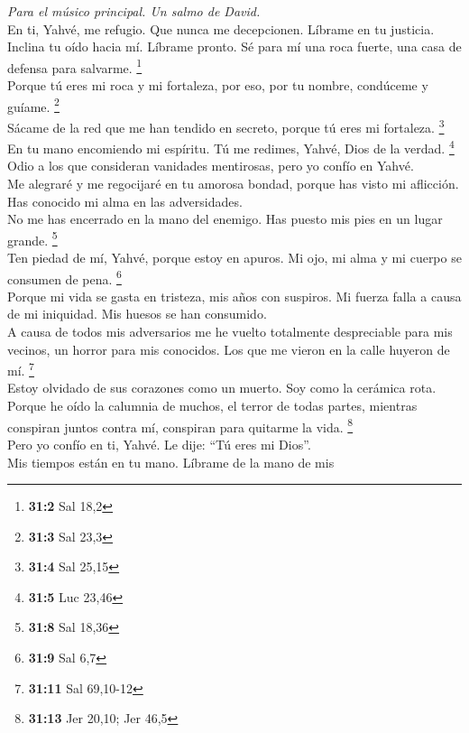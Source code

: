 \emph{Para el músico principal. Un salmo de David.}\\
 En ti, Yahvé, me refugio. Que nunca me decepcionen.
Líbrame en tu justicia.\\
 Inclina tu oído hacia mí. Líbrame pronto. Sé para mí una
roca fuerte, una casa de defensa para salvarme. \footnote{\textbf{31:2}
  Sal 18,2}\\
 Porque tú eres mi roca y mi fortaleza, por eso, por tu
nombre, condúceme y guíame. \footnote{\textbf{31:3} Sal 23,3}\\
 Sácame de la red que me han tendido en secreto, porque tú
eres mi fortaleza. \footnote{\textbf{31:4} Sal 25,15}\\
 En tu mano encomiendo mi espíritu. Tú me redimes, Yahvé,
Dios de la verdad. \footnote{\textbf{31:5} Luc 23,46}\\
 Odio a los que consideran vanidades mentirosas, pero yo
confío en Yahvé.\\
 Me alegraré y me regocijaré en tu amorosa bondad, porque
has visto mi aflicción. Has conocido mi alma en las adversidades.\\
 No me has encerrado en la mano del enemigo. Has puesto
mis pies en un lugar grande. \footnote{\textbf{31:8} Sal 18,36}\\
 Ten piedad de mí, Yahvé, porque estoy en apuros. Mi ojo,
mi alma y mi cuerpo se consumen de pena. \footnote{\textbf{31:9} Sal 6,7}\\
 Porque mi vida se gasta en tristeza, mis años con
suspiros. Mi fuerza falla a causa de mi iniquidad. Mis huesos se han
consumido.\\
 A causa de todos mis adversarios me he vuelto totalmente
despreciable para mis vecinos, un horror para mis conocidos. Los que me
vieron en la calle huyeron de mí. \footnote{\textbf{31:11} Sal 69,10-12}\\
 Estoy olvidado de sus corazones como un muerto. Soy como
la cerámica rota.\\
 Porque he oído la calumnia de muchos, el terror de todas
partes, mientras conspiran juntos contra mí, conspiran para quitarme la
vida. \footnote{\textbf{31:13} Jer 20,10; Jer 46,5}\\
 Pero yo confío en ti, Yahvé. Le dije: ``Tú eres mi
Dios''.\\
 Mis tiempos están en tu mano. Líbrame de la mano de mis
